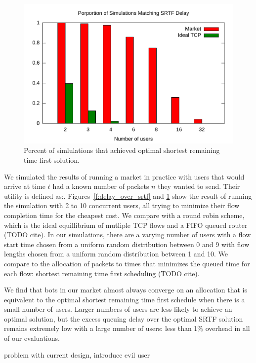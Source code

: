 \begin{figure}
\includegraphics[width=\columnwidth]{plots/percent_match_srtf.pdf}
\caption{Percent of simlulations that achieved optimal shortest remaining time first solution.}
\label{f:percent_match_srtf}
\end{figure}

We simulated the results of running a market in practice with users that would arrive at time $t$ had a known number of packets $n$ they wanted to send.
Their utility is defined as:.
Figures~\ref{f:delay_over_srtf} and \ref{f:percent_match_srtf} show the result of running the simulation with 2 to 10 concurrent users, all trying to minimize their flow completion time for the cheapest cost.
We compare with a round robin scheme, which is the ideal equillibrium of mutliple TCP flows and a FIFO queued router (TODO cite).
In our simulations, there are a varying number of users with a flow start time chosen from a uniform random distribution between 0 and 9 with flow lengths chosen from a uniform random distribution between 1 and 10. We compare to the allocation of packets to times that minimizes the queued time for each flow: shortest remaining time first scheduling (TODO cite).

We find that bots in our market almost always converge on an allocation that is equivalent to the optimal shortest remaining time first schedule when there is a small number of users. Larger numbers of users are less likely to achieve an optimal solution, but the excess queuing delay over the optimal SRTF solution remains extremely low with a large number of users: less than 1\% overhead in all of our evaluations.

problem with current design, introduce evil user
